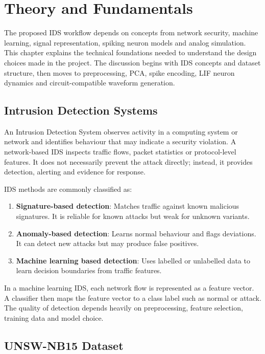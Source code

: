\chapter{Theory and Fundamentals}

The proposed IDS workflow depends on concepts from network security, machine learning, signal representation, spiking neuron models and analog simulation. This chapter explains the technical foundations needed to understand the design choices made in the project. The discussion begins with IDS concepts and dataset structure, then moves to preprocessing, PCA, spike encoding, LIF neuron dynamics and circuit-compatible waveform generation.

\section{Intrusion Detection Systems}

An Intrusion Detection System observes activity in a computing system or network and identifies behaviour that may indicate a security violation. A network-based IDS inspects traffic flows, packet statistics or protocol-level features. It does not necessarily prevent the attack directly; instead, it provides detection, alerting and evidence for response.

IDS methods are commonly classified as:
\begin{enumerate}
\item \textbf{Signature-based detection}: Matches traffic against known malicious signatures. It is reliable for known attacks but weak for unknown variants.
\item \textbf{Anomaly-based detection}: Learns normal behaviour and flags deviations. It can detect new attacks but may produce false positives.
\item \textbf{Machine learning based detection}: Uses labelled or unlabelled data to learn decision boundaries from traffic features.
\end{enumerate}

In a machine learning IDS, each network flow is represented as a feature vector. A classifier then maps the feature vector to a class label such as normal or attack. The quality of detection depends heavily on preprocessing, feature selection, training data and model choice.

\section{UNSW-NB15 Dataset}

